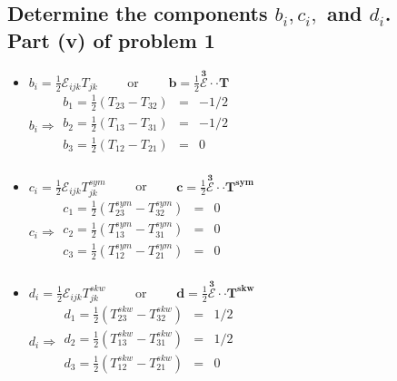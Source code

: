 \documentclass[10pt, letterpaper]{article}
\begin{document}
	\subsection{Determine the components $b_i, c_i,$ and $d_i$.\\
				Part (v) of problem 1}
			\begin{itemize}
				\item $b_i = \frac{1}{2} \mathcal{E}_{ijk} T_{jk} \qquad$ or $ \qquad
					\bm{b} = \frac{1}{2} \bm{{\overset{3}{\mathcal{E}}}} \cdot \cdot \bm{T}$ \\
					$b_i \Rightarrow 
						 \begin{matrix} 
							b_1 = \frac{1}{2}(T_{23} - T_{32}) & = & -1/2\\
							b_2 = \frac{1}{2}(T_{13} - T_{31}) & = & -1/2\\
							b_3 = \frac{1}{2}(T_{12} - T_{21}) & = & 0\\
						\end{matrix}$
				\item $c_i = \frac{1}{2} \mathcal{E}_{ijk} T_{jk}^{sym} \qquad$ or $ \qquad
					\bm{c} = \frac{1}{2} \bm{{\overset{3}{\mathcal{E}}}} \cdot \cdot \bm{T^{sym}}$ \\
					$c_i \Rightarrow 
						 \begin{matrix} 
							c_1 = \frac{1}{2}(T_{23}^{sym} - T_{32}^{sym}) & = & 0\\
							c_2 = \frac{1}{2}(T_{13}^{sym} - T_{31}^{sym}) & = & 0\\
							c_3 = \frac{1}{2}(T_{12} ^{sym}- T_{21}^{sym}) & = & 0\\
						\end{matrix}$

				\item $d_i = \frac{1}{2} \mathcal{E}_{ijk} T_{jk}^{skw} \qquad$ or $ \qquad
					\bm{d} = \frac{1}{2} \bm{{\overset{3}{\mathcal{E}}}} \cdot \cdot \bm{T^{skw}}$ \\
					$d_i \Rightarrow 
						 \begin{matrix} 
							d_1 = \frac{1}{2}(T_{23}^{skw} - T_{32}^{skw}) & = & 1/2\\
							d_2 = \frac{1}{2}(T_{13}^{skw} - T_{31}^{skw}) & = & 1/2\\
							d_3 = \frac{1}{2}(T_{12} ^{skw}- T_{21}^{skw}) & = & 0\\
						\end{matrix}$
			\end{itemize}
\end{document}

